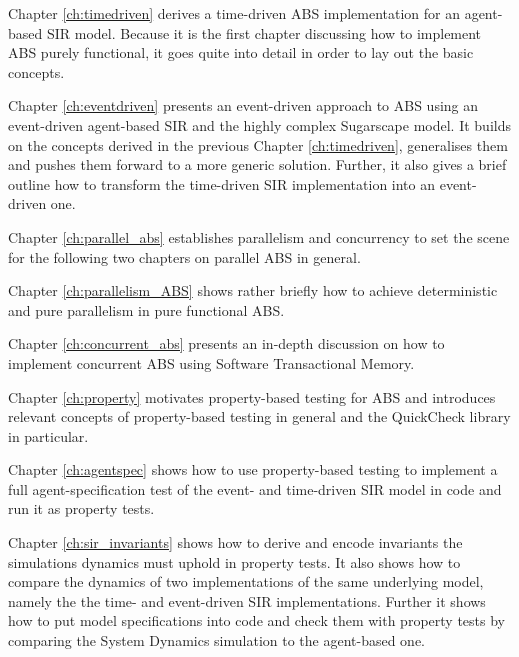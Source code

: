 \medskip

Chapter \ref{ch:timedriven} derives a time-driven ABS implementation for an agent-based SIR model. Because it is the first chapter discussing how to implement ABS purely functional, it goes quite into detail in order to lay out the basic concepts.

\medskip

Chapter \ref{ch:eventdriven} presents an event-driven approach to ABS using an event-driven agent-based SIR and the highly complex Sugarscape model. It builds on the concepts derived in the previous Chapter \ref{ch:timedriven}, generalises them and pushes them forward to a more generic solution. Further, it also gives a brief outline how to transform the time-driven SIR implementation into an event-driven one.

\medskip

Chapter \ref{ch:parallel_abs} establishes parallelism and concurrency to set the scene for the following two chapters on parallel ABS in general.

\medskip

Chapter \ref{ch:parallelism_ABS} shows rather briefly how to achieve deterministic and pure parallelism in pure functional ABS. 

\medskip

Chapter \ref{ch:concurrent_abs} presents an in-depth discussion on how to implement concurrent ABS using Software Transactional Memory.

\medskip

Chapter \ref{ch:property} motivates property-based testing for ABS and introduces relevant concepts of property-based testing in general and the QuickCheck library in particular. 

\medskip

Chapter \ref{ch:agentspec} shows how to use property-based testing to implement a full agent-specification test of the event- and time-driven SIR model in code and run it as property tests.

\medskip

Chapter \ref{ch:sir_invariants} shows how to derive and encode invariants the simulations dynamics must uphold in property tests. It also shows how to compare the dynamics of two implementations of the same underlying model, namely the the time- and event-driven SIR implementations. Further it shows how to put model specifications into code and check them with property tests by comparing the System Dynamics simulation to the agent-based one.

